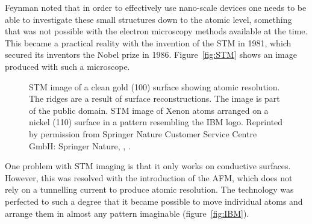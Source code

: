 Feynman noted that in order to effectively use nano-scale devices one needs to
be able to investigate these small structures down to the atomic level,
something that was not possible with the electron microscopy methods available
at the time. This became a practical reality with the invention of the \ac{STM}
in 1981,\autocite{Binnig_ScanningTunnelingMicroscopy_1986} which secured its
inventors the Nobel prize in 1986. Figure~\ref{fig:STM} shows an image produced
with such a microscope.
%
\begin{figure}[htb]
    \centering
    \hspace{0.05\textwidth}
    \caption{\protect{} \acs{STM} image of a clean gold (100) surface showing atomic resolution. The ridges are a result of surface reconstructions. The image is part of the public domain. \protect{} \acs{STM} image of Xenon atoms arranged on a nickel (110) surface in a pattern resembling the IBM logo. Reprinted by permission from Springer Nature Customer Service Centre GmbH: Springer Nature, \autocite{Eigler_Positioningsingleatoms_1990a}, .}
    \label{fig:STMexamples}
\end{figure}
%
One problem with \ac{STM} imaging is that it only works on conductive surfaces.
However, this was resolved with the introduction of the \ac{AFM}, which does not
rely on a tunnelling current to produce atomic
resolution.\autocite{Binnig_AtomicForceMicroscope_1986} The technology was
perfected to such a degree that it became possible to move individual atoms and
arrange them in almost any pattern imaginable
(figure~\ref{fig:IBM}).\autocite{Eigler_Positioningsingleatoms_1990a}

